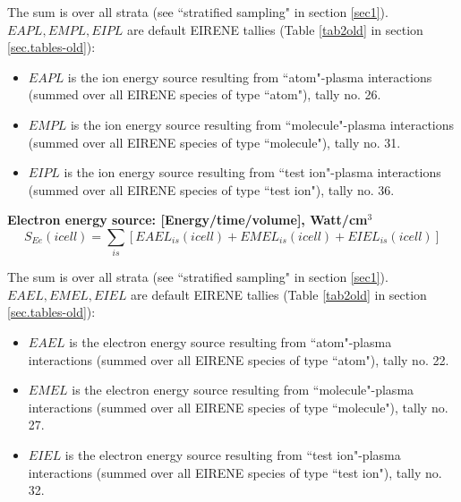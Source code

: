  The sum is over all strata (see  ``stratified sampling" in section \ref{sec1}). $EAPL, EMPL,  EIPL$ are default EIRENE tallies (Table \ref{tab2old} in section \ref{sec.tables-old}):
 \begin{itemize}
 \item
 $EAPL$ is the ion energy source  resulting from ``atom"-plasma interactions (summed over all EIRENE species of type ``atom"), tally no. 26.
 \item
 $EMPL$ is the ion energy source  resulting from ``molecule"-plasma interactions (summed over all EIRENE species of type ``molecule"), tally no. 31.
 \item
 $EIPL$ is the ion energy source  resulting from ``test ion"-plasma interactions (summed over all EIRENE species of type ``test ion"), tally no. 36.
 \end{itemize}

\textbf{Electron energy source: [Energy/time/volume], Watt/cm$^3$}
\begin{equation}
 S_{Ee}(icell) = \sum_{is} \left[EAEL_{is}(icell) + EMEL_{is}(icell) + EIEL_{is}(icell) \right]
 \end{equation}

 The sum is over all strata (see  ``stratified sampling" in section \ref{sec1}). $EAEL, EMEL,  EIEL$ are default EIRENE tallies (Table \ref{tab2old} in section \ref{sec.tables-old}):
 \begin{itemize}
 \item
 $EAEL$ is the electron energy source  resulting from ``atom"-plasma interactions (summed over all EIRENE species of type ``atom"), tally no. 22.
 \item
 $EMEL$ is the electron energy source  resulting from ``molecule"-plasma interactions (summed over all EIRENE species of type ``molecule"), tally no. 27.
 \item
 $EIEL$ is the electron energy source  resulting from ``test ion"-plasma interactions (summed over all EIRENE species of type ``test ion"), tally no. 32.
 \end{itemize}

